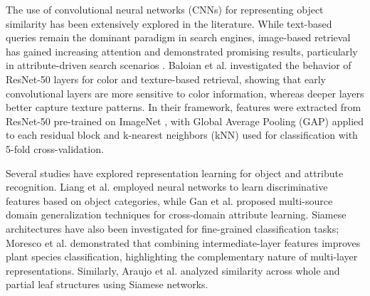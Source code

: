 \documentclass[conference]{IEEEtran}
\begin{document}

The use of convolutional neural networks (CNNs) for representing object similarity has been extensively explored in the literature. While text-based queries remain the dominant paradigm in search engines, image-based retrieval has gained increasing attention and demonstrated promising results, particularly in attribute-driven search scenarios \cite{b2}. Baloian et al. \cite{b2} investigated the behavior of ResNet-50 layers for color and texture-based retrieval, showing that early convolutional layers are more sensitive to color information, whereas deeper layers better capture texture patterns. In their framework, features were extracted from ResNet-50 pre-trained on ImageNet \cite{b3}, with Global Average Pooling (GAP) applied to each residual block and k-nearest neighbors (kNN) used for classification with 5-fold cross-validation.

Several studies have explored representation learning for object and attribute recognition. Liang et al. \cite{b10} employed neural networks to learn discriminative features based on object categories, while Gan et al. \cite{b11} proposed multi-source domain generalization techniques for cross-domain attribute learning. Siamese architectures have also been investigated for fine-grained classification tasks; Moresco et al. \cite{b8} demonstrated that combining intermediate-layer features improves plant species classification, highlighting the complementary nature of multi-layer representations. Similarly, Araujo et al. \cite{b9} analyzed similarity across whole and partial leaf structures using Siamese networks.
\end{document}
